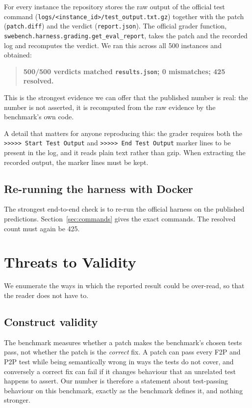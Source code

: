 \documentclass[11pt,a4paper]{article}
\begin{document}
For every instance the repository stores the raw output of the official test command
(\texttt{logs/<instance\_id>/test\_output.txt.gz}) together with the patch
(\texttt{patch.diff}) and the verdict (\texttt{report.json}). The official grader
function, \texttt{swebench.harness.grading.get\_eval\_report}, takes the patch and the
recorded log and recomputes the verdict. We ran this across all 500 instances and
obtained:

\begin{quote}
\textbf{500/500 verdicts matched \texttt{results.json}; 0 mismatches; 425 resolved.}
\end{quote}

This is the strongest evidence we can offer that the published number is real: the number
is not asserted, it is recomputed from the raw evidence by the benchmark's own code.

A detail that matters for anyone reproducing this: the grader requires both the
\texttt{>>>>> Start Test Output} and \texttt{>>>>> End Test Output} marker lines to be
present in the log, and it reads plain text rather than gzip. When extracting the
recorded output, the marker lines must be kept.

\subsection{Re-running the harness with Docker}

The strongest end-to-end check is to re-run the official harness on the published
predictions. Section~\ref{sec:commands} gives the exact commands. The resolved count must
again be 425.

\section{Threats to Validity}
\label{sec:threats}

We enumerate the ways in which the reported result could be over-read, so that the
reader does not have to.

\subsection{Construct validity}

The benchmark measures whether a patch makes the benchmark's chosen tests pass, not
whether the patch is the \emph{correct} fix. A patch can pass every F2P and P2P test
while being semantically wrong in ways the tests do not cover, and conversely a correct
fix can fail if it changes behaviour that an unrelated test happens to assert. Our
number is therefore a statement about test-passing behaviour on this benchmark, exactly
as the benchmark defines it, and nothing stronger.
\end{document}
